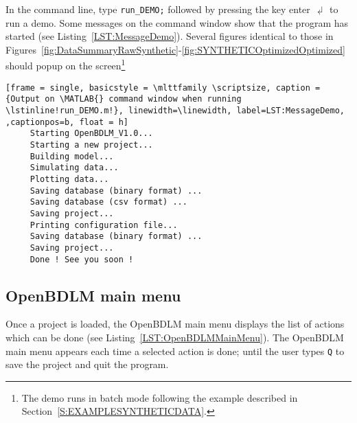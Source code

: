 In the \MATLAB{} command line, type  
\colorbox{light-gray}{\lstinline[basicstyle = \mlttfamily \small, backgroundcolor = \color{light-gray}]!run_DEMO;! }
 followed by pressing the key enter $\dlsh$ to run a demo. 
Some messages on the \MATLAB{} command window show that the program has started (see Listing~\ref{LST:MessageDemo}).
Several figures identical to those in Figures~\ref{fig:DataSummaryRawSynthetic}-\ref{fig:SYNTHETICOptimizedOptimized} should popup on the screen\footnote{The demo runs in batch mode following the example described in Section~\ref{S:EXAMPLESYNTHETICDATA}.}


\begin{lstlisting}[frame = single, basicstyle = \mlttfamily \scriptsize, caption = {Output on \MATLAB{} command window when running \lstinline!run_DEMO.m!}, linewidth=\linewidth, label=LST:MessageDemo, ,captionpos=b, float = h] 
     Starting OpenBDLM_V1.0...
     Starting a new project...
     Building model...
     Simulating data...
     Plotting data...
     Saving database (binary format) ...
     Saving database (csv format) ...
     Saving project...
     Printing configuration file...
     Saving database (binary format) ...
     Saving project...
     Done ! See you soon !
\end{lstlisting}



\subsection{OpenBDLM main menu}
\label{S:OPENBDLMMAINMENU}

Once a project is loaded, the OpenBDLM main menu displays the list of actions which can be done (see Listing~\ref{LST:OpenBDLMMainMenu}). 
The OpenBDLM main menu appears each time a selected action is done; until the user types \colorbox{light-gray}{\lstinline[basicstyle = \mlttfamily \small ]!Q!} to save the project and quit the program.

